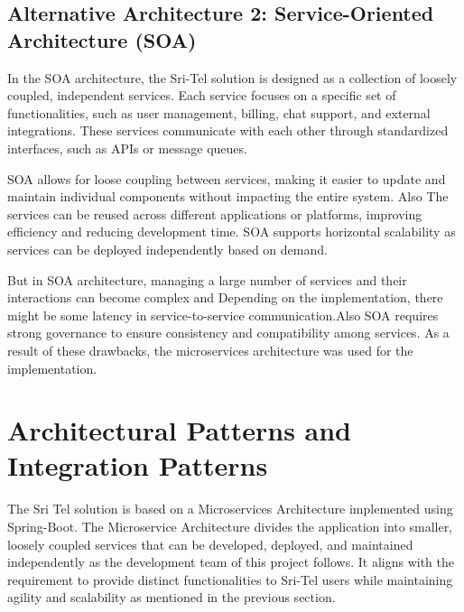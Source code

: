 \documentclass[12pt]{article}
\begin{document}
\subsection{Alternative Architecture 2: Service-Oriented Architecture (SOA)}
\par In the SOA architecture, the Sri-Tel solution is designed as a collection of loosely coupled, independent services. Each service focuses on a specific set of functionalities, such as user management, billing, chat support, and external integrations. These services communicate with each other through standardized interfaces, such as APIs or message queues.
\par SOA allows for loose coupling between services, making it easier to update and maintain individual components without impacting the entire system. Also The  services can be reused across different applications or platforms, improving efficiency and reducing development time. SOA supports horizontal scalability as services can be deployed independently based on demand.
\par But in SOA architecture, managing a large number of services and their interactions can become complex and Depending on the implementation, there might be some latency in service-to-service communication.Also SOA requires strong governance to ensure consistency and compatibility among services. As a result of these drawbacks, the microservices architecture was used for the implementation. 



\section{Architectural Patterns and Integration Patterns}
\par The Sri Tel solution is based on a Microservices Architecture implemented using Spring-Boot. The Microservice Architecture divides the application into smaller, loosely coupled services that can be developed, deployed, and maintained independently as the development team of this project follows. It aligns with the requirement to provide distinct functionalities to Sri-Tel users while maintaining agility and scalability as mentioned in the previous section.
\end{document}
